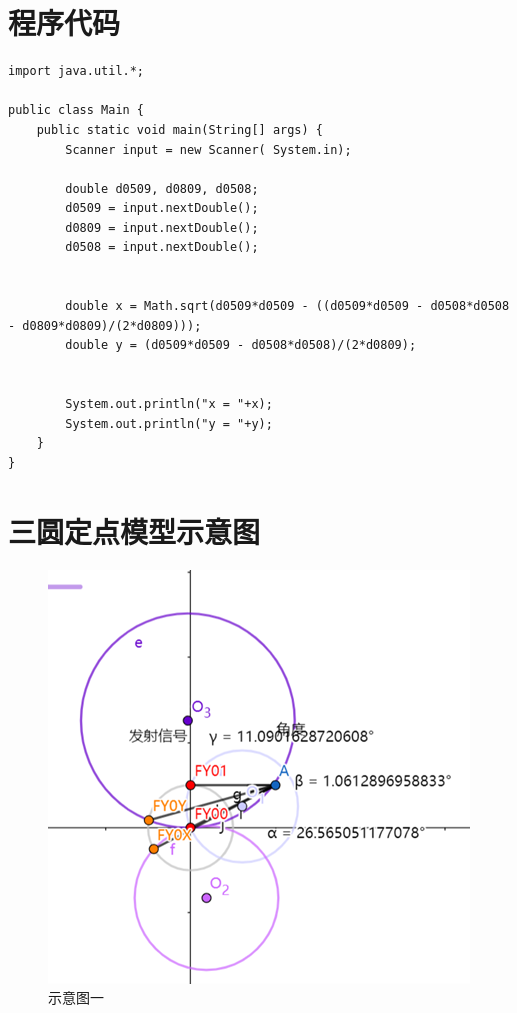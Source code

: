 
\nocite{*}      %




\appendix
\section{程序代码}

\begin{lstlisting}[caption={搜索代码}]
import java.util.*;

public class Main {
    public static void main(String[] args) {
        Scanner input = new Scanner( System.in);

        double d0509, d0809, d0508;
        d0509 = input.nextDouble();
        d0809 = input.nextDouble();
        d0508 = input.nextDouble();


        double x = Math.sqrt(d0509*d0509 - ((d0509*d0509 - d0508*d0508 - d0809*d0809)/(2*d0809)));
        double y = (d0509*d0509 - d0508*d0508)/(2*d0809);
        

        System.out.println("x = "+x);
        System.out.println("y = "+y);
    }
}
\end{lstlisting}


\section{三圆定点模型示意图}

\begin{figure}[h]
    \centering
    \includegraphics[scale=0.7]{res/figure111148.png}
    \caption{示意图一}
\end{figure}

